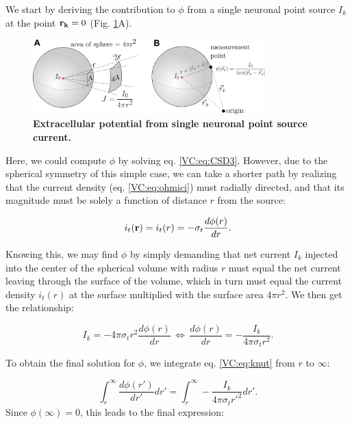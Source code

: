We start by deriving the contribution to $\phi$ from a single neuronal point source $I_k$ at the point ${\bf r_k}=0$ (Fig. \ref{VC:fig:pointsource}A). 

\begin{figure}[!ht]
\begin{center}
\includegraphics[width=0.8\textwidth]{Figures/VC/EP_from_pointsource_illustration.png}
\end{center}
\caption{\textbf{Extracellular potential from single neuronal point source current.} 
 
}
\label{VC:fig:pointsource}
\end{figure}

Here, we could compute $\phi$ by solving eq. \ref{VC:eq:CSD3}. However, due to the spherical symmetry of this simple case, we can take a shorter path by realizing that the current density (eq. \ref{VC:eq:ohmici}) must radially directed, and that its magnitude must be solely a function of distance $r$ from the source:

\begin{equation}
i_t({\bf r}) = i_t(r) = -\sigma_t \frac{d\phi(r)}{dr}.
\end{equation}

Knowing this, we may find $\phi$ by simply demanding that net current $I_k$ injected into the center of the spherical volume with radius $r$ must equal the net current leaving through the surface of the volume, which in turn must equal the current density $i_t(r)$ at the surface multiplied with the surface area $4\pi r^2$. We then get the relationship:

\begin{equation}
I_k = -4\pi \sigma_t r^2  \frac{d\phi(r)}{dr} \, \iff \, \frac{d\phi(r)}{dr} = -\frac{I_k}{4\pi \sigma_t r^2 }.
\label{VC:eq:knut}
\end{equation}

To obtain the final solution for $\phi$, we integrate eq. \ref{VC:eq:knut} from $r$ to $\infty$:

\begin{equation}
\int_r^{\infty} \frac{d\phi(r')}{dr'} dr' = \int_r^{\infty} -\frac{I_k}{4\pi \sigma_t r'^2 } dr'.
\label{VC:eq:knut2}
\end{equation}
Since $\phi({\infty}) = 0$, this leads to the final expression:

